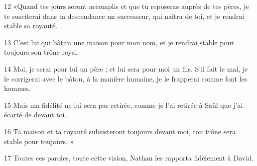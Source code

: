 
12 «Quand tes jours seront accomplis et que tu reposeras auprès de tes pères, je te susciterai dans ta descendance un successeur, qui naîtra de toi, et je rendrai stable sa royauté.

13 C’est lui qui bâtira une maison pour mon nom, et je rendrai stable pour toujours son trône royal.

14 Moi, je serai pour lui un père ; et lui sera pour moi un fils. S’il fait le mal, je le corrigerai avec le bâton, à la manière humaine, je le frapperai comme font les hommes.

15 Mais ma fidélité ne lui sera pas retirée, comme je l’ai retirée à Saül que j’ai écarté de devant toi.

16 Ta maison et ta royauté subsisteront toujours devant moi, ton trône sera stable pour toujours. »

17 Toutes ces paroles, toute cette vision, Nathan les rapporta fidèlement à David.
